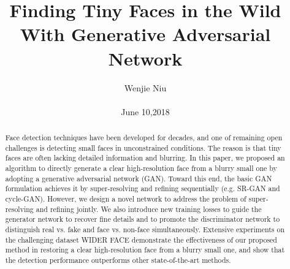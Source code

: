 \documentclass[10pt,twocolumn,letterpaper]{article}
\begin{document}
\title{Finding Tiny Faces in the Wild With Generative Adversarial Network}

\author{Wenjie Niu\\\\ June 10,2018}

\maketitle

\begin{abstract}
  \cite{Bai_2018_CVPR}Face detection techniques have been developed for
decades, and one of remaining open challenges is detecting
small faces in unconstrained conditions. The reason is
that tiny faces are often lacking detailed information and
blurring. In this paper, we proposed an algorithm to directly
generate a clear high-resolution face from a blurry small
one by adopting a generative adversarial network (GAN).
Toward this end, the basic GAN formulation achieves it by
super-resolving and refining sequentially (e.g. SR-GAN and
cycle-GAN). However, we design a novel network to address
the problem of super-resolving and refining jointly. We also
introduce new training losses to guide the generator network
to recover fine details and to promote the discriminator
network to distinguish real vs. fake and face vs. non-face simultaneously. Extensive experiments on the challenging
dataset WIDER FACE demonstrate the effectiveness of our
proposed method in restoring a clear high-resolution face
from a blurry small one, and show that the detection performance
outperforms other state-of-the-art methods.\par
\end{abstract}

\end{document}
